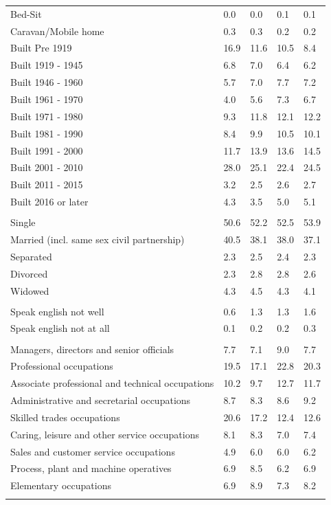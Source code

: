 \documentclass{article}
\begin{document}
\begin{table}[h]
\begin{tabular}{KTTTT}
Bed-Sit & 0.0& 0.0& 0.1& 0.1\\
Caravan/Mobile home & 0.3& 0.3& 0.2& 0.2\\
    \hline
Built Pre 1919 & 16.9& 11.6& 10.5&  8.4\\
Built 1919 - 1945 & 6.8& 7.0& 6.4& 6.2\\
Built  1946 - 1960 & 5.7& 7.0& 7.7& 7.2\\
Built  1961 - 1970 & 4.0& 5.6& 7.3& 6.7\\
Built  1971 - 1980 &  9.3& 11.8& 12.1& 12.2\\
Built  1981 - 1990 &  8.4&  9.9& 10.5& 10.1\\
Built  1991 - 2000 & 11.7& 13.9& 13.6& 14.5\\
Built  2001 - 2010 & 28.0& 25.1& 22.4& 24.5\\
Built  2011 - 2015 & 3.2& 2.5& 2.6& 2.7\\
Built  2016 or later & 4.3& 3.5& 5.0& 5.1\\
\hline
    \\
    \hline
Single & 50.6& 52.2& 52.5& 53.9\\
Married (incl. same sex civil partnership) & 40.5& 38.1& 38.0& 37.1\\
Separated  & 2.3& 2.5& 2.4& 2.3\\
Divorced  & 2.3& 2.8& 2.8& 2.6\\
Widowed & 4.3& 4.5& 4.3& 4.1\\
\hline
    \\ 
    \hline
Speak english not well & 0.6& 1.3& 1.3& 1.6\\
Speak english not at all & 0.1& 0.2& 0.2& 0.3\\
\hline
    \\
    \hline
Managers, directors and senior officials & 7.7& 7.1& 9.0& 7.7\\
Professional occupations & 19.5& 17.1& 22.8& 20.3\\
Associate professional and technical occupations & 10.2&  9.7& 12.7& 11.7\\
Administrative and secretarial occupations & 8.7& 8.3& 8.6& 9.2\\
Skilled trades occupations & 20.6& 17.2& 12.4& 12.6\\
Caring, leisure and other service occupations & 8.1& 8.3& 7.0& 7.4\\
Sales and customer service occupations & 4.9& 6.0& 6.0& 6.2\\
Process, plant and machine operatives & 6.9& 8.5& 6.2& 6.9\\
Elementary occupations & 6.9& 8.9& 7.3& 8.2\\
\hline
\end{tabular}
\end{table}
\end{document}

